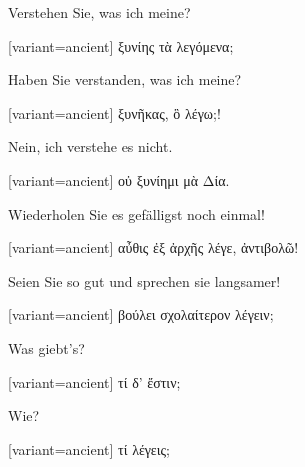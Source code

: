 Verstehen Sie, was ich meine?

\switchcolumn

\begin{greek}[variant=ancient]%
ξυνίης τὰ λεγόμενα;

\end{greek}%
\switchcolumn*

Haben Sie verstanden, was ich meine?

\switchcolumn

\begin{greek}[variant=ancient]%
ξυνῆκας, ὃ λέγω;!

\end{greek}%
\switchcolumn*

Nein, ich verstehe es nicht.

\switchcolumn

\begin{greek}[variant=ancient]%
οὐ ξυνίημι μὰ Δία.

\end{greek}%
\switchcolumn*

Wiederholen Sie es gefälligst noch einmal!

\switchcolumn

\begin{greek}[variant=ancient]%
αὖθις ἐξ ἀρχῆς λέγε, ἀντιβολῶ!

\end{greek}%
\switchcolumn*

Seien Sie so gut und sprechen sie langsamer!

\switchcolumn

\begin{greek}[variant=ancient]%
βούλει σχολαίτερον λέγειν;

\end{greek}%
\indent Was giebt's?

\switchcolumn

\begin{greek}[variant=ancient]%
τί δ' ἔστιν;

\end{greek}%
\switchcolumn*

Wie?

\switchcolumn

\begin{greek}[variant=ancient]%
τί λέγεις;

\end{greek}%
\switchcolumn*

